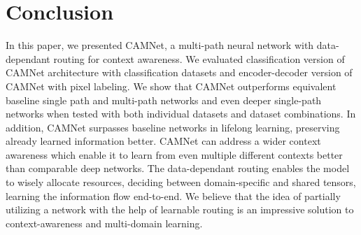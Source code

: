 \documentclass[10pt,twocolumn,letterpaper]{article}
\begin{document}
\section{Conclusion}
\label{se:conclusion}
\vspace{-0.05in}
In this paper, we presented CAMNet, a multi-path neural network with data-dependant routing for context awareness. We evaluated classification version of CAMNet architecture with classification datasets and encoder-decoder version of CAMNet with pixel labeling. We show that CAMNet outperforms equivalent baseline single path and multi-path networks and even deeper single-path networks when tested with both individual datasets and dataset combinations. In addition, CAMNet surpasses baseline networks in lifelong learning, preserving already learned information better. CAMNet can address a wider context awareness which enable it to learn from even multiple different contexts better than comparable deep networks. The data-dependant routing enables the model to wisely allocate resources, deciding between domain-specific and shared tensors, learning the information flow end-to-end. We believe that the idea of partially utilizing a network with the help of learnable routing is an impressive solution to context-awareness and multi-domain learning.
\end{document}
